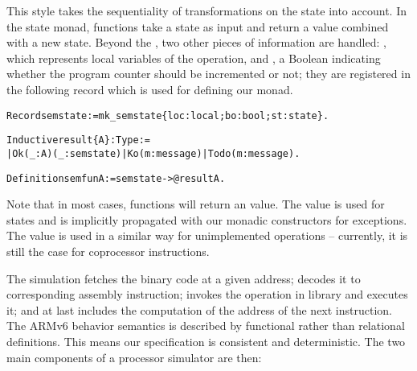 This style takes the sequentiality of transformations on the state
into account.  In the state monad, functions take a state as input and
return a value combined with a new state.  Beyond the \statedef, two
other pieces of information are handled: , which
represents local variables of the operation, and , a
Boolean indicating whether the program counter should be incremented
or not; they are registered in the following record which is used for
defining our monad.

\begin{alltt}
Record semstate := mk\_semstate \{ loc : local ;  bo : bool ; st : state \}.

Inductive result \{A\} : Type :=
    | Ok (\_ : A) (\_ : semstate) | Ko (m : message) | Todo (m : message).

Definition semfun A := semstate -> @result A.
\end{alltt}

Note that in most cases, %
functions will return an  value.
The value  is used for \unpred states
and is implicitly propagated with our monadic constructors for exceptions.
The value  is used in a similar way for unimplemented operations
-- currently, it is still the case for coprocessor instructions.

The simulation fetches the binary code at a given address; decodes it to corresponding
assembly instruction; invokes the operation in library and executes it; and at last
includes the computation of the address of the next instruction.
The ARMv6 behavior semantics is described by functional
rather than relational definitions.
This means our specification is consistent and deterministic.
The two main components of a processor simulator are then:

